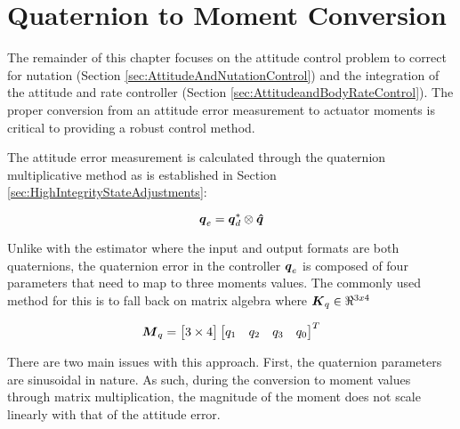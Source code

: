 \section{Quaternion to Moment Conversion}
\label{sec:QuaternionToMomentConversion}

The remainder of this chapter focuses on the attitude control problem to correct for nutation (Section \ref{sec:AttitudeAndNutationControl}) and the integration of the attitude and rate controller (Section \ref{sec:AttitudeandBodyRateControl}).  The proper conversion from an attitude error measurement to actuator moments is critical to providing a robust control method.

The attitude error measurement is calculated through the quaternion multiplicative method as is established in Section \ref{sec:HighIntegrityStateAdjustments}:

\begin{equation}
  \boldsymbol{q}_e = \boldsymbol{q}_d^* \otimes \boldsymbol{\hat{q}}
\end{equation}

Unlike with the estimator where the input and output formats are both quaternions, the quaternion error in the controller $\boldsymbol{q}_e$ is composed of four parameters that need to map to three moments values.  The commonly used method for this is to fall back on matrix algebra where $\boldsymbol{K}_q \in \Re^{3x4}$

\begin{equation}
  \boldsymbol{M}_q = \begin{bmatrix} 3 \times 4 \end{bmatrix} \begin{bmatrix} q_1 & q_2 & q_3 & q_0 \end{bmatrix}^T
  \label{eqn:traditional_attitude_controller}
\end{equation}

There are two main issues with this approach.  First, the quaternion parameters are sinusoidal in nature.  As such, during the conversion to moment values through matrix multiplication, the magnitude of the moment does not scale linearly with that of the attitude error.

